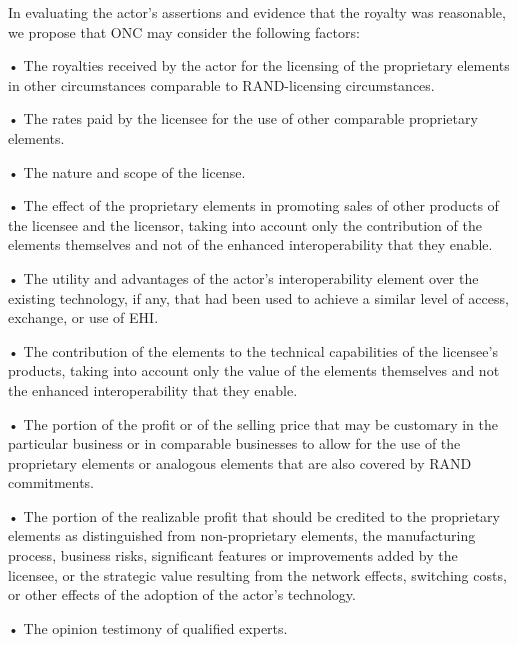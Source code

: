 \documentclass[twoside,11pt]{article}
\begin{document}




          In evaluating the actor's assertions and evidence that the royalty was reasonable, we propose that ONC may consider the following factors:


          • The royalties received by the actor for the licensing of the proprietary elements in other circumstances comparable to RAND-licensing circumstances.


          • The rates paid by the licensee for the use of other comparable proprietary elements.


          • The nature and scope of the license.


          • The effect of the proprietary elements in promoting sales of other products of the licensee and the licensor, taking into account only the contribution of the elements themselves and not of the enhanced interoperability that they enable.


          • The utility and advantages of the actor's interoperability element over the existing technology, if any, that had been used to achieve a similar level of access, exchange, or use of EHI.


          • The contribution of the elements to the technical capabilities of the licensee's products, taking into account only the value of the elements themselves and not the enhanced interoperability that they enable.


          • The portion of the profit or of the selling price that may be customary in the particular business or in comparable businesses to allow for the use of the proprietary elements or analogous elements that are also covered by RAND commitments.


          • The portion of the realizable profit that should be credited to the proprietary elements as distinguished from non-proprietary elements, the manufacturing process, business risks, significant features or improvements added by the licensee, or the strategic value resulting from the network effects, switching costs, or other effects of the adoption of the actor's technology.


          • The opinion testimony of qualified experts.
\end{document}
